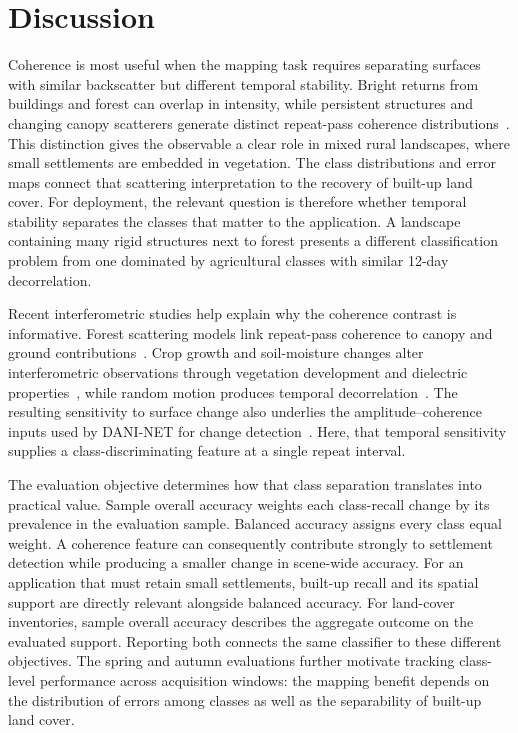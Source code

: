 \section{Discussion}
\label{sec:mech}

Coherence is most useful when the mapping task requires separating surfaces with similar backscatter but different temporal stability. Bright returns from buildings and forest can overlap in intensity, while persistent structures and changing canopy scatterers generate distinct repeat-pass coherence distributions~\cite{Sica2019,Aghababaei2026}. This distinction gives the observable a clear role in mixed rural landscapes, where small settlements are embedded in vegetation. The class distributions and error maps connect that scattering interpretation to the recovery of built-up land cover. For deployment, the relevant question is therefore whether temporal stability separates the classes that matter to the application. A landscape containing many rigid structures next to forest presents a different classification problem from one dominated by agricultural classes with similar 12-day decorrelation.

Recent interferometric studies help explain why the coherence contrast is informative. Forest scattering models link repeat-pass coherence to canopy and ground contributions~\cite{Aghababaei2026}. Crop growth and soil-moisture changes alter interferometric observations through vegetation development and dielectric properties~\cite{Yuan2024,Ao2025}, while random motion produces temporal decorrelation~\cite{Chen2026}. The resulting sensitivity to surface change also underlies the amplitude--coherence inputs used by DANI-NET for change detection~\cite{Costa2025}. Here, that temporal sensitivity supplies a class-discriminating feature at a single repeat interval.

The evaluation objective determines how that class separation translates into practical value. Sample overall accuracy weights each class-recall change by its prevalence in the evaluation sample. Balanced accuracy assigns every class equal weight. A coherence feature can consequently contribute strongly to settlement detection while producing a smaller change in scene-wide accuracy. For an application that must retain small settlements, built-up recall and its spatial support are directly relevant alongside balanced accuracy. For land-cover inventories, sample overall accuracy describes the aggregate outcome on the evaluated support. Reporting both connects the same classifier to these different objectives. The spring and autumn evaluations further motivate tracking class-level performance across acquisition windows: the mapping benefit depends on the distribution of errors among classes as well as the separability of built-up land cover.

